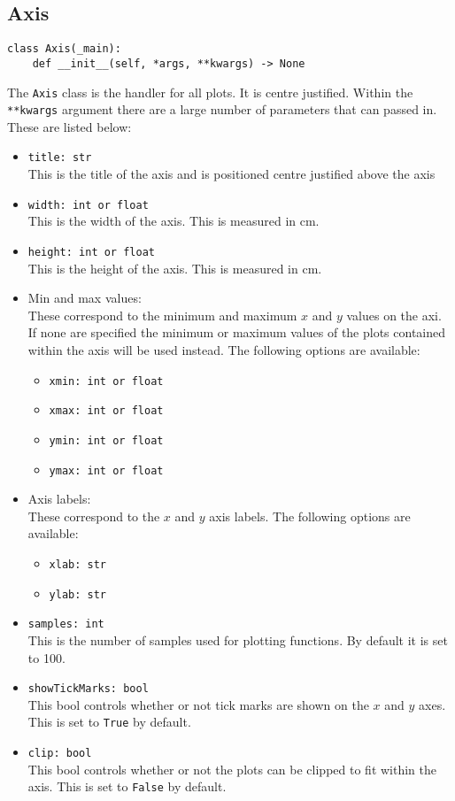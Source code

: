 \documentclass{article}
\begin{document}
\subsection{Axis}\label{subsec:axis}
\begin{verbatim}
class Axis(_main):
	def __init__(self, *args, **kwargs) -> None
\end{verbatim}
The \verb|Axis| class is the handler for all plots. It is centre justified. Within the \verb|**kwargs| argument there are a large number of parameters that can passed in. These are listed below:\begin{itemize}
\item \verb|title: str|\\This is the title of the axis and is positioned centre justified above the axis
\item \verb|width: int or float|\\This is the width of the axis. This is measured in cm.
\item \verb|height: int or float|\\This is the height of the axis. This is measured in cm.
\item Min and max values:\\
These correspond to the minimum and maximum $x$ and $y$ values on the axi. If none are specified the minimum or maximum values of the plots contained within the axis will be used instead. The following options are available:\begin{itemize}
\item \verb|xmin: int or float|
\item \verb|xmax: int or float|
\item \verb|ymin: int or float|
\item \verb|ymax: int or float|
\end{itemize}

\item Axis labels:\\
These correspond to the $x$ and $y$ axis labels. The following options are available:\begin{itemize}
\item \verb|xlab: str|
\item \verb|ylab: str|
\end{itemize}

\item \verb|samples: int|\\This is the number of samples used for plotting functions. By default it is set to 100.
\item \verb|showTickMarks: bool|\\This bool controls whether or not tick marks are shown on the $x$ and $y$ axes. This is set to \verb|True| by default.
\item \verb|clip: bool|\\This bool controls whether or not the plots can be clipped to fit within the axis. This is set to \verb|False| by default.
\end{itemize}
\end{document}
